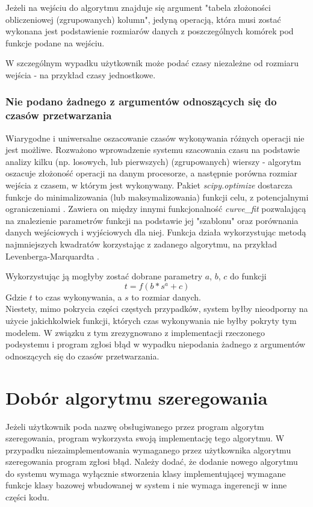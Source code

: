 \documentclass[brudnopis]{xmgr}
\begin{document}
Jeżeli na wejściu do algorytmu znajduje się argument "tabela złożoności obliczeniowej (zgrupowanych) kolumn", jedyną operacją, która musi zostać wykonana jest podstawienie rozmiarów danych z poszczególnych komórek pod funkcje podane na wejściu.
\medskip

W szczególnym wypadku użytkownik może podać czasy niezależne od rozmiaru wejścia - na przykład czasy jednostkowe.
\medskip

\subsubsection{Nie podano żadnego z argumentów odnoszących się do czasów przetwarzania}

Wiarygodne i uniwersalne oszacowanie czasów wykonywania różnych operacji nie jest możliwe.
Rozważono wprowadzenie systemu szacowania czasu na podstawie analizy kilku (np. losowych, lub pierwszych) (zgrupowanych) wierszy - algorytm oszacuje złożoność operacji na danym procesorze, a następnie porówna rozmiar wejścia z czasem, w którym jest wykonywany.
Pakiet \emph{scipy.optimize} dostarcza funkcje do minimalizowania (lub maksymalizowania) funkcji celu, z potencjalnymi ograniczeniami \cite{scipyoptimize}. Zawiera on między innymi funkcjonalność \emph{curve\_fit} pozwalającą na znalezienie parametrów funkcji na podstawie jej "szablonu" oraz porównania danych wejściowych i wyjściowych dla niej.
Funkcja działa wykorzystując metodą najmniejszych kwadratów korzystając z zadanego algorytmu, na przykład Levenberga-Marquardta \cite{lourakis2005brief}.

Wykorzystując ją mogłyby zostać dobrane parametry $a$, $b$, $c$ do funkcji
$$t = f(b * s^a + c)$$
Gdzie $t$ to czas wykonywania, a $s$ to rozmiar danych.\\
Niestety, mimo pokrycia części częstych przypadków, system byłby nieodporny na użycie jakichkolwiek funkcji, których czas wykonywania nie byłby pokryty tym modelem.
W związku z tym zrezygnowano z implementacji rzeczonego podsystemu i program zgłosi błąd w wypadku niepodania żadnego z argumentów odnoszących się do czasów przetwarzania.
\medskip


\section{Dobór algorytmu szeregowania}

Jeżeli użytkownik poda nazwę obsługiwanego przez program algorytm szeregowania, program wykorzysta swoją implementację tego algorytmu.
W przypadku niezaimplementowania wymaganego przez użytkownika algorytmu szeregowania program zgłosi błąd.
Należy dodać, że dodanie nowego algorytmu do systemu wymaga wyłącznie stworzenia klasy implementującej wymagane funkcje klasy bazowej wbudowanej w system i nie wymaga ingerencji w inne części kodu.
\medskip
\end{document}
